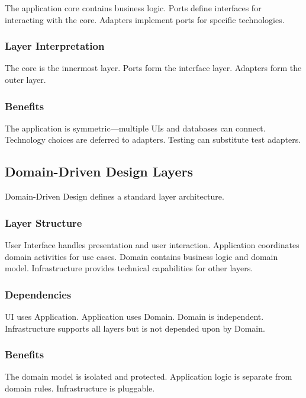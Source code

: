 \documentclass[11pt]{article}
\begin{document}
The application core contains business logic. Ports define interfaces for interacting with the core. Adapters implement ports for specific technologies.

\subsubsection{Layer Interpretation}

The core is the innermost layer. Ports form the interface layer. Adapters form the outer layer.

\subsubsection{Benefits}

The application is symmetric---multiple UIs and databases can connect. Technology choices are deferred to adapters. Testing can substitute test adapters.

\subsection{Domain-Driven Design Layers}

Domain-Driven Design defines a standard layer architecture.

\subsubsection{Layer Structure}

User Interface handles presentation and user interaction. Application coordinates domain activities for use cases. Domain contains business logic and domain model. Infrastructure provides technical capabilities for other layers.

\subsubsection{Dependencies}

UI uses Application. Application uses Domain. Domain is independent. Infrastructure supports all layers but is not depended upon by Domain.

\subsubsection{Benefits}

The domain model is isolated and protected. Application logic is separate from domain rules. Infrastructure is pluggable.
\end{document}

